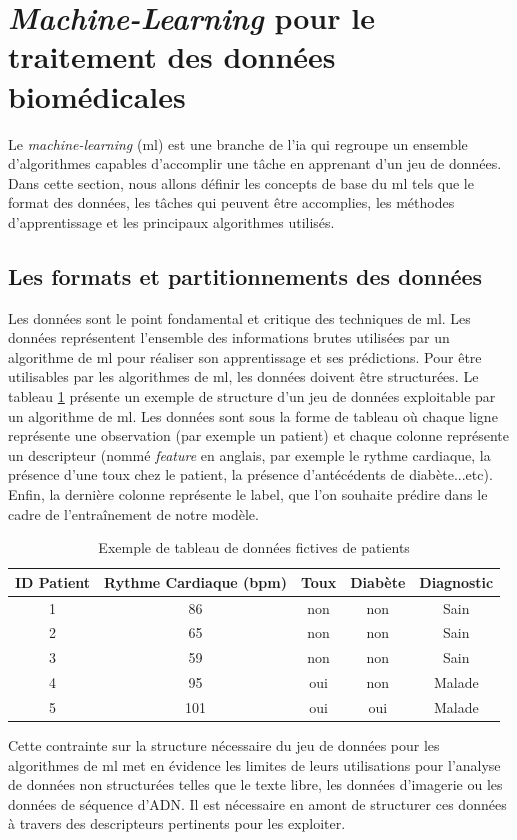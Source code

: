 \section{\textit{Machine-Learning} pour le traitement des données biomédicales}
Le \textit{machine-learning} (\gls{ml}) est une branche de l'\gls{ia} qui regroupe un ensemble d'algorithmes capables d'accomplir une tâche en apprenant d'un jeu de données. Dans cette section, nous allons définir les concepts de base du \gls{ml} tels que le format des données, les tâches qui peuvent être accomplies, les méthodes d'apprentissage et les principaux algorithmes utilisés.

\subsection{Les formats et partitionnements des données}
Les données sont le point fondamental et critique des techniques de \gls{ml}. Les données représentent l'ensemble des informations brutes utilisées par un algorithme de \gls{ml} pour réaliser son apprentissage et ses prédictions. Pour être utilisables par les algorithmes de \gls{ml}, les données doivent être structurées. Le tableau \ref{table:dataset_intro} présente un exemple de structure d'un jeu de données exploitable par un algorithme de \gls{ml}. Les données sont sous la forme de tableau où chaque ligne représente une observation (par exemple un patient) et chaque colonne représente un descripteur (nommé \textit{feature} en anglais, par exemple le rythme cardiaque, la présence d'une toux chez le patient, la présence d'antécédents de diabète...etc). Enfin, la dernière colonne représente le label, que l'on souhaite prédire dans le cadre de l'entraînement de notre modèle.
\begin{table}[!ht]
\centering
\begin{tabular}{|c|c|c|c|c|} 
 \hline
 ID Patient & Rythme Cardiaque (bpm) & Toux & Diabète & Diagnostic \\
 \hline
 1 & 86 & non & non & Sain \\ 
 2 & 65 & non & non & Sain \\ 
 3 & 59 & non & non & Sain \\ 
 4 & 95 & oui & non & Malade \\ 
 5 & 101 & oui & oui & Malade\\ 
 \hline
\end{tabular}
\caption{Exemple de tableau de données fictives de patients}
\label{table:dataset_intro}
\end{table}
Cette contrainte sur la structure nécessaire du jeu de données pour les algorithmes de \gls{ml} met en évidence les limites de leurs utilisations pour l'analyse de données non structurées telles que le texte libre, les données d'imagerie ou les données de séquence d'ADN. Il est nécessaire en amont de structurer ces données à travers des descripteurs pertinents pour les exploiter.

